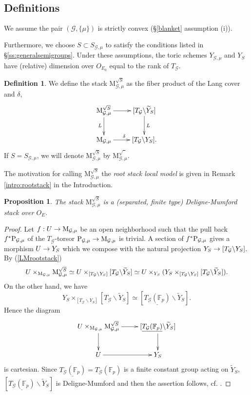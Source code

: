 \documentclass[reqno, 10pt]{amsart}
\makeatletter
\newcommand{\BF}{\ensuremath{\mathbb {F}}\xspace}
\newcommand{\CG}{\ensuremath{\mathcal {G}}\xspace}
\newcommand{\wt}{\widetilde}
\newcommand{\bs}{\backslash}
\newtheorem{proposition}[subsubsection]{Proposition}
\theoremstyle{definition}
\newtheorem{definition}[subsubsection]{Definition}
\numberwithin{equation}{subsection}
\numberwithin{subsubsection}{subsection}
\renewcommand{\to}{%
   \ifbool{@display}{\longrightarrow}{\rightarrow}%
   }
\newcommand{\und}{\underline}
\newcommand{\Mloc}{{\rm M}}
\newcommand{\ti}{\tilde}
\newcommand{\Mlocroot}{{\mathrm M}^{\sqrt{S}}}
\newcommand{\Mlocrooto}{{\mathrm M}^{\sqrt{\phantom{a}}}}
\makeatother
\begin{document}
\subsection{Definitions}  We assume the pair $(\CG,\{\mu\})$ is strictly convex (\S \ref{blanket} assumption (i)).


 Furthermore, we choose $S\subset S_{\CG,\mu}$ to satisfy the conditions listed in \S\ref{ss:generalsemigroups}. 
 Under these assumptions,  the toric schemes $Y_{\CG,\mu}$ and $Y_S$ have (relative) dimension over $O_{E_0}$ equal to the rank of 
 $T_\CG$. 
 

\begin{definition}
We define the stack $\Mlocroot_{\CG,\mu}$ as the fiber product of the Lang cover and $\delta$,
\begin{equation}\label{LMrootstack}
\begin{aligned}
 \xymatrix{
      \Mlocroot_{\CG,\mu} \ar[r] \ar[d]_L  &   [T_\CG \bs \wt Y_S ] \ar[d]^L \\
       \Mloc_{\CG,\mu}\ar[r]^\delta &  [T_\CG \bs Y_S ]  .
        }
        \end{aligned}
\end{equation}
 If $S=S_{\CG,\mu}$, we will  denote $\Mlocroot_{\CG,\mu}$ by $\Mlocrooto_{\CG,\mu}$.
\end{definition}
 The  motivation for calling $\Mlocroot_{\CG,\mu}$ the \emph{root stack local model} is given in  Remark \ref{intro:rootstack} in the Introduction.





\begin{proposition}\label{prop:DM}
 The stack $\Mlocroot_{\CG,\mu}$ is a (separated, finite type) Deligne-Mumford stack over $O_E$. 
\end{proposition}

\begin{proof}
Let $f: U\to \Mloc_{\CG,\mu}$ be an open neighborhood such that the pull back $f^*{\rm P}_{\CG,\mu}$ of the $T_\CG$-torsor 
${\rm P}_{\CG,\mu}\to \Mloc_{\CG,\mu}$ is trivial.
A section of $f^*{\rm P}_{\CG,\mu}$ gives a morphism $U\to Y_S$ which we compose with the natural projection $Y_S\to [T_\CG\bs Y_S]$. By 
(\ref{LMrootstack})
\[
U\times_{\Mloc_{\CG,\mu}}   \Mlocroot_{\CG,\mu} \simeq U\times_{[T_\CG\bs Y_S]}[T_\CG\bs \wt Y_S]\simeq 
U\times_{Y_S}(Y_S\times_{[T_\CG\bs Y_S]}[T_\CG\bs \wt Y_S]).
\]
On the other hand, we have
\[
Y_S\times_{[T_\CG\bs Y_S]}[T_\CG\bs \wt Y_S]\simeq [\und{T_\CG(\BF_p)}\bs \wt Y_S].
\]
Hence the diagram 
\begin{equation}\label{DMrstack}
\begin{aligned}
 \xymatrix{
      U\times_{\Mloc_{\CG,\mu}}   \Mlocroot_{\CG,\mu}\ar[r] \ar[d]  &   [\und{T_\CG(\BF_p)} \bs \wt Y_S ] \ar[d] \\
       U\ar[r] &  Y_S 
        }
        \end{aligned}
\end{equation}
is cartesian. Since $\und{T_\CG(\BF_p)} =T_\CG(\BF_p)$ is a finite constant group acting on $\ti Y_S$, $[\und{T_\CG(\BF_p)}\bs \wt Y_S]$ is Deligne-Mumford and then the assertion follows, cf.  \cite[Thm. 2.3.3]{Cadman}.  
\end{proof}
\end{document}
